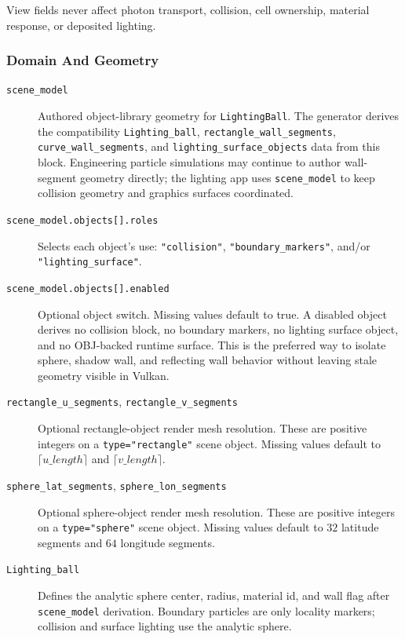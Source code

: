 View fields never affect photon transport, collision, cell ownership,
material response, or deposited lighting.

\subsubsection{Domain And Geometry}

\begin{description}
    \item[\texttt{scene\_model}] Authored object-library geometry for
    \texttt{LightingBall}.  The generator derives the compatibility
    \texttt{Lighting\_ball}, \texttt{rectangle\_wall\_segments},
    \texttt{curve\_wall\_segments}, and \texttt{lighting\_surface\_objects}
    data from this block.  Engineering particle simulations may continue to
    author wall-segment geometry directly; the lighting app uses
    \texttt{scene\_model} to keep collision geometry and graphics surfaces
    coordinated.
    \item[\texttt{scene\_model.objects[].roles}] Selects each object's use:
    \texttt{"collision"}, \texttt{"boundary\_markers"}, and/or
    \texttt{"lighting\_surface"}.
    \item[\texttt{scene\_model.objects[].enabled}] Optional object switch.
    Missing values default to true.  A disabled object derives no collision
    block, no boundary markers, no lighting surface object, and no OBJ-backed
    runtime surface.  This is the preferred way to isolate sphere, shadow
    wall, and reflecting wall behavior without leaving stale geometry visible
    in Vulkan.
    \item[\texttt{rectangle\_u\_segments},
    \texttt{rectangle\_v\_segments}] Optional rectangle-object render mesh
    resolution.  These are positive integers on a
    \texttt{type="rectangle"} scene object.  Missing values default to
    \(\lceil u\_length\rceil\) and \(\lceil v\_length\rceil\).
    \item[\texttt{sphere\_lat\_segments},
    \texttt{sphere\_lon\_segments}] Optional sphere-object render mesh
    resolution.  These are positive integers on a \texttt{type="sphere"}
    scene object.  Missing values default to \(32\) latitude segments and
    \(64\) longitude segments.
    \item[\texttt{Lighting\_ball}] Defines the analytic sphere center,
    radius, material id, and wall flag after \texttt{scene\_model}
    derivation.  Boundary particles are only locality markers; collision and
    surface lighting use the analytic sphere.

\end{description}
